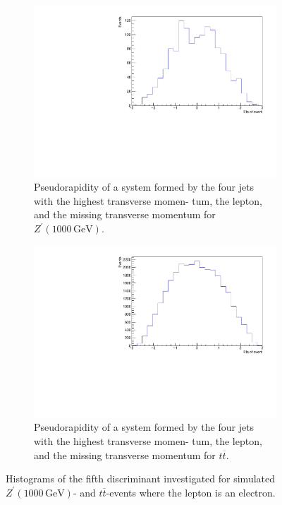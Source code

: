 \begin{figure}[H]
\begin{subfigure}{0.49\textwidth}
      \label{fig:5h}
    \end{subfigure}\\
  \begin{subfigure}{0.49\textwidth}%
    \centering%
    \includegraphics[width=\textwidth]{plots/discriminant/zprime1000.el_dis5.pdf}%
    \caption{Pseudorapidity of a system formed by the four jets with the highest transverse momen- tum, the lepton, and the missing transverse momentum for $Z^\prime(1000 \, \si{\giga\eV})$.}%
    \label{fig:6a}%
  \end{subfigure}%
  \hfill
  \begin{subfigure}{0.49\textwidth}%
    \centering%
    \includegraphics[width=\textwidth]{plots/discriminant/ttbar.el_dis5.pdf}%
     \caption{Pseudorapidity of a system formed by the four jets with the highest transverse momen- tum, the lepton, and the missing transverse momentum for $t \overline{t}$.}%
     \label{fig:6b}%
   \end{subfigure}%
   \caption{Histograms of the fifth discriminant investigated for simulated $Z^\prime(1000 \, \si{\giga\eV})$- and $t \overline{t}$-events where the lepton is an electron.}%
   \label{fig:6}%
 \end{figure}


